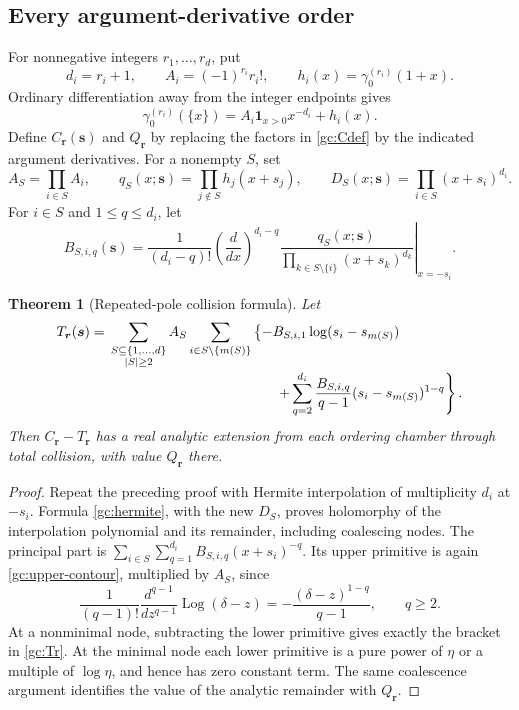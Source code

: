 \documentclass[11pt]{article}
\numberwithin{equation}{section}
\newtheorem{theorem}{Theorem}[section]
\theoremstyle{definition}
\theoremstyle{remark}
\begin{document}
\subsection{Every argument-derivative order}
For nonnegative integers $r_1,\ldots,r_d$, put
\[
 d_i=r_i+1,\qquad A_i=(-1)^{r_i}r_i!,\qquad
 h_i(x)=\gamma_0^{(r_i)}(1+x).
\]
Ordinary differentiation away from the integer endpoints gives
\[
 \gamma_0^{(r_i)}(\{x\})
    =A_i\boldsymbol{1}_{x>0}x^{-d_i}+h_i(x).
\]
Define $C_{\boldsymbol r}(\boldsymbol s)$ and $Q_{\boldsymbol r}$ by
replacing the factors in \eqref{gc:Cdef} by the indicated argument
derivatives.  For a nonempty $S$, set
\[
 A_S=\prod_{i\in S}A_i,\qquad
 q_S(x;\boldsymbol s)=\prod_{j\notin S}h_j(x+s_j),\qquad
 D_S(x;\boldsymbol s)=\prod_{i\in S}(x+s_i)^{d_i}.
\]
For $i\in S$ and $1\le q\le d_i$, let
\begin{equation}\label{gc:B}
 B_{S,i,q}(\boldsymbol s)=
 \frac1{(d_i-q)!}
 \left.\left(\frac{d}{dx}\right)^{d_i-q}
 \frac{q_S(x;\boldsymbol s)}
 {\prod_{k\in S\setminus\{i\}}(x+s_k)^{d_k}}
 \right|_{x=-s_i}.
\end{equation}

\begin{theorem}[Repeated-pole collision formula]\label{gc:derivative}
Let
\begin{align}\label{gc:Tr}
 T_{\boldsymbol r}(\boldsymbol s)
 ={}&\sum_{\substack{S\subseteq\{1,\ldots,d\}\\ |S|\ge2}}
 A_S\sum_{i\in S\setminus\{m(S)\}}
 \left\{-B_{S,i,1}\log(s_i-s_{m(S)})\right.\notag\\[-2pt]
 &\hspace{42mm}\left.
 +\sum_{q=2}^{d_i}\frac{B_{S,i,q}}{q-1}
                   (s_i-s_{m(S)})^{1-q}\right\}.
\end{align}
Then $C_{\boldsymbol r}-T_{\boldsymbol r}$ has a real analytic extension
from each ordering chamber through total collision, with value
$Q_{\boldsymbol r}$ there.
\end{theorem}

\begin{proof}
Repeat the preceding proof with Hermite interpolation of multiplicity
$d_i$ at $-s_i$.  Formula \eqref{gc:hermite}, with the new $D_S$, proves
holomorphy of the interpolation polynomial and its remainder, including
coalescing nodes.  The principal part is
$\sum_{i\in S}\sum_{q=1}^{d_i}B_{S,i,q}(x+s_i)^{-q}$.  Its upper primitive
is again \eqref{gc:upper-contour}, multiplied by $A_S$, since
\[
 \frac1{(q-1)!}\frac{d^{q-1}}{dz^{q-1}}
      \operatorname{Log}(\delta-z)
 =-\frac{(\delta-z)^{1-q}}{q-1},\qquad q\ge2.
\]
At a nonminimal node, subtracting the lower primitive gives exactly the
bracket in \eqref{gc:Tr}.  At the minimal node each lower primitive is a
pure power of $\eta$ or a multiple of $\log\eta$, and hence has zero
constant term.  The same coalescence argument identifies the value of the
analytic remainder with $Q_{\boldsymbol r}$.
\end{proof}
\end{document}
